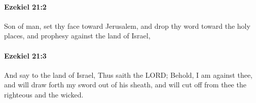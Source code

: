 		\paragraph{Ezekiel 21:2} %
			\label{EZEKIEL-21-2}

			Son of man, set thy face toward Jerusalem, and drop thy word toward the holy places, and prophesy against the land of Israel,


		\paragraph{Ezekiel 21:3} %
			\label{EZEKIEL-21-3}

			And say to the land of Israel, Thus saith the LORD; Behold, I am against thee, and will draw forth my sword out of his sheath, and will cut off from thee the righteous and the wicked.


